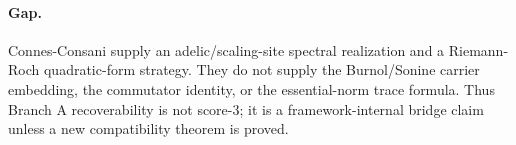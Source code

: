 \paragraph{Gap.}
Connes-Consani supply an adelic/scaling-site spectral realization and a
Riemann-Roch quadratic-form strategy.  They do not supply the Burnol/Sonine
carrier embedding, the commutator identity, or the essential-norm trace formula.
Thus Branch A recoverability is not score-3; it is a framework-internal bridge
claim unless a new compatibility theorem is proved.
